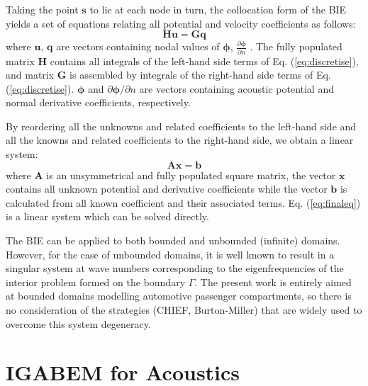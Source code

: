 \documentclass[review]{elsarticle}
\begin{document}
Taking the point $\mathbf s$ to lie at each node in turn, the collocation form of the BIE yields a set of equations relating all potential and velocity coefficients as follows:
\begin{equation}
\mathbf H\boldsymbol u = \mathbf G \boldsymbol q
\label{eq:HG}
\end{equation}
where $\boldsymbol u$, $\boldsymbol q$ are vectors containing nodal values of $\boldsymbol\phi$, $\frac{\partial{\boldsymbol\phi}}{\partial{n}}$ . The fully populated matrix $\mathbf H$ contains all integrals of the left-hand side terms of Eq. (\ref{eq:discretise}), and matrix $\mathbf G$ is assembled by integrals of the right-hand side terms of Eq. (\ref{eq:discretise}). $\boldsymbol\phi$ and  $\partial{\boldsymbol\phi}/\partial{n}$ are vectors containing acoustic potential and normal derivative coefficients, respectively. 

By reordering all the unknowns and related coefficients to the left-hand side and all the knowns and related coefficients to the right-hand side, we obtain a linear system:
\begin{equation}
\mathbf{Ax}=\mathbf b
\label{eq:finaleq}
\end{equation}
where $\mathbf{A}$ is an unsymmetrical and fully populated square matrix, the vector $\mathbf{x}$ contains all unknown potential and derivative coefficients while the vector  $\mathbf{b}$ is calculated from all known coefficient and their associated terms. Eq. (\ref{eq:finaleq}) is a linear system which can be solved directly. 

The BIE can be applied to both bounded and unbounded (infinite) domains. However, for the case of unbounded domains, it is well known to result in a singular system at wave numbers corresponding to the eigenfrequencies of the interior problem formed on the boundary $\Gamma$. The present work is entirely aimed at bounded domains modelling automotive passenger compartments, so there is no consideration of the strategies (CHIEF\cite{Harry}, Burton-Miller\cite{Burton201}) that are widely used to overcome this system degeneracy.


\section{IGABEM for Acoustics}
\end{document}
